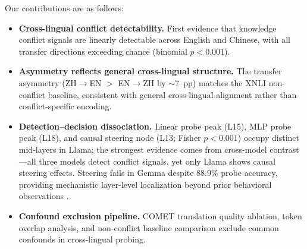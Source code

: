 Our contributions are as follows:
\begin{itemize}
    \item \textbf{Cross-lingual conflict detectability.} First evidence that knowledge conflict signals are linearly detectable across English and Chinese, with all transfer directions exceeding chance (binomial $p < 0.001$).
    \item \textbf{Asymmetry reflects general cross-lingual structure.} The transfer asymmetry (ZH$\to$EN $>$ EN$\to$ZH by ${\sim}$7~pp) matches the XNLI non-conflict baseline, consistent with general cross-lingual alignment rather than conflict-specific encoding.
    \item \textbf{Detection--decision dissociation.} Linear probe peak (L15), MLP probe peak (L18), and causal steering node (L13; Fisher $p < 0.001$) occupy distinct mid-layers in Llama; the strongest evidence comes from cross-model contrast---all three models detect conflict signals, yet only Llama shows causal steering effects. Steering fails in Gemma despite 88.9\% probe accuracy, providing mechanistic layer-level localization beyond prior behavioral observations \citep{basu2026interpretability}.
    \item \textbf{Confound exclusion pipeline.} COMET translation quality ablation, token overlap analysis, and non-conflict baseline comparison exclude common confounds in cross-lingual probing.
\end{itemize}
